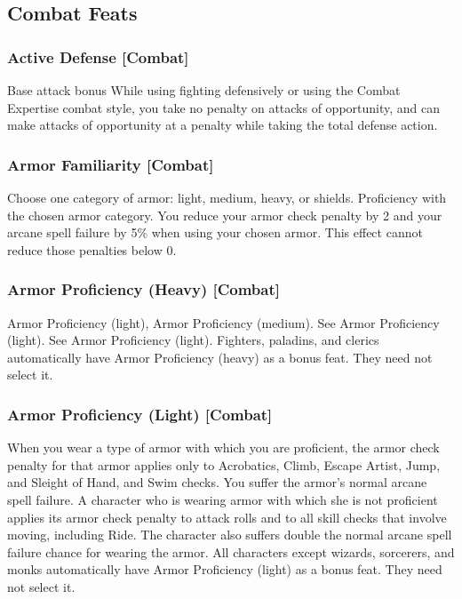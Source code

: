 \subsection{Combat Feats}

\subsubsection{Active Defense [Combat]}
 Base attack bonus 
 While using fighting defensively or using the Combat Expertise combat style, you take no penalty on attacks of opportunity, and can make attacks of opportunity at a  penalty while taking the total defense action.

\subsubsection{Armor Familiarity [Combat]}
Choose one category of armor: light, medium, heavy, or shields.
 Proficiency with the chosen armor category.
 You reduce your armor check penalty by 2 and your arcane spell failure by 5\% when using your chosen armor. This effect cannot reduce those penalties below 0.

\subsubsection{Armor Proficiency (Heavy) [Combat]}
 Armor Proficiency (light), Armor Proficiency (medium).
 See Armor Proficiency (light).
 See Armor Proficiency (light).
 Fighters, paladins, and clerics automatically have Armor Proficiency (heavy) as a bonus feat. They need not select it.

\subsubsection{Armor Proficiency (Light) [Combat]}
 When you wear a type of armor with which you are proficient, the armor check penalty for that armor applies only to Acrobatics, Climb, Escape Artist, Jump, and Sleight of Hand, and Swim checks. You suffer the armor's normal arcane spell failure.
 A character who is wearing armor with which she is not proficient applies its armor check penalty to attack rolls and to all skill checks that involve moving, including Ride. The character also suffers double the normal arcane spell failure chance for wearing the armor.
 All characters except wizards, sorcerers, and monks automatically have Armor Proficiency (light) as a bonus feat. They need not select it.

